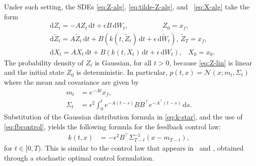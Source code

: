 \documentclass[letterpaper, 10 pt, conference]{ieeeconf}  %
\newcommand{\at}[1]{{\color{blue} #1}}
\def\R{\mathbb{R}}
\def\R{\mathbb{R}}
\newcommand{\ud}{\,\mathrm{d}}
\begin{document}
Under such setting, the SDEs \eqref{eq:Z-alg}, \eqref{eq:tilde-Z-alg}, and ~\eqref{eq:X-alg} take the form
\begin{subequations}
\begin{align}
    &\ud Z_t = -A Z_t \ud t + \epsilon B \ud W_t, \hspace{59pt} Z_0 = x_f,\label{eq:Z-lin}\\
    &\ud \tilde Z_t = A \tilde Z_t \ud t + B( k(t,\tilde Z_t) \ud t +\epsilon \ud \tilde W_t), \hspace{2pt} \tilde Z_T = x_f, \label{eq:tilde-Z-lin}\\
    &\ud X_t \!=\! A X_t \ud t \!+\! B(k(t,X_t)\ud t \!+ \!\epsilon \ud W_t), \hspace{10pt} X_0\! =\! x_0. \label{eq:X-lin}
\end{align}
\end{subequations}
The probability density of $Z_t$ is Gaussian, for all $t>0$, because \eqref{eq:Z-lin} is linear and the initial state $Z_0$ is deterministic.  In particular, $p(t,x)=\mathcal N(x;m_t,\Sigma_t)$ where the mean and covariance are given by
\begin{align*}
      m_t &= e^{-At}x_f,\\
      \Sigma_t &=  \epsilon^2 \int_0^t e^{-A(t-s)}BB^\top e^{-A^\top(t-s)}\ud s.
\end{align*}
Substitution of the Gaussian distribution formula in \eqref{eq:k-star}, and the use of \eqref{eq:fbcontrol}, yields the following formula for the feedback control law:
\begin{align}\label{eq:k-linear}
    k(t,x) 
    &= -\epsilon^2 B^\top \Sigma_{T-t}^{-1}(x-m_{T-t}),
\end{align}
for $t \in [0,T)$. This is similar to the control law that appears in~\cite[Eq. (11)]{pakniyat2021steering} and \cite{chen2015stochastic}, obtained through a stochastic optimal control formulation.
\end{document}
